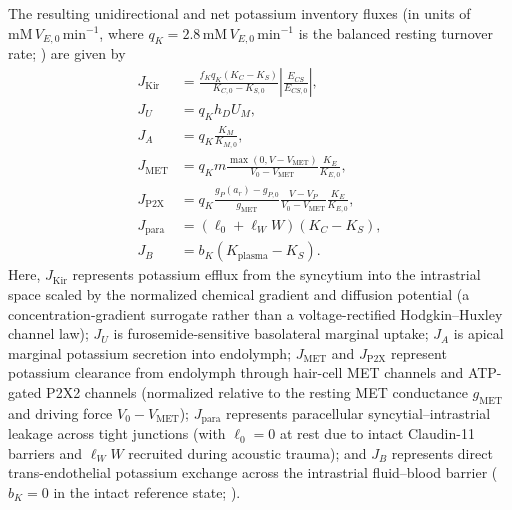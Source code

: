 \documentclass[final,5p,times]{elsarticle}
\begin{document}
The resulting unidirectional and net potassium inventory fluxes (in units of \(\mathrm{mM}\,V_{E,0}\,\mathrm{min}^{-1}\), where \(q_K = 2.8\,\mathrm{mM}\,V_{E,0}\,\mathrm{min}^{-1}\) is the balanced resting turnover rate; \citealt{Konishi1978,Nin2012}) are given by
\begin{align}
  J_{\mathrm{Kir}} &= \frac{f_K q_K (K_C - K_S)}{K_{C,0} - K_{S,0}}\left|\frac{E_{CS}}{E_{CS,0}}\right|, \label{eq:jkir}\\
  J_U &= q_K h_D U_M, \label{eq:ju}\\
  J_A &= q_K \frac{K_M}{K_{M,0}}, \label{eq:ja}\\
  J_{\mathrm{MET}} &= q_K m \frac{\max(0, V - V_{\mathrm{MET}})}{V_0 - V_{\mathrm{MET}}}\frac{K_E}{K_{E,0}}, \label{eq:jmet}\\
  J_{\mathrm{P2X}} &= q_K \frac{g_P(a_r) - g_{P,0}}{g_{\mathrm{MET}}}\frac{V - V_P}{V_0 - V_{\mathrm{MET}}}\frac{K_E}{K_{E,0}}, \label{eq:jp2x}\\
  J_{\mathrm{para}} &= (\ell_0 + \ell_W W)(K_C - K_S), \label{eq:jpara}\\
  J_B &= b_K(K_{\mathrm{plasma}} - K_S). \label{eq:jb}
\end{align}
Here, \(J_{\mathrm{Kir}}\) represents potassium efflux from the syncytium into the intrastrial space scaled by the normalized chemical gradient and diffusion potential (a concentration-gradient surrogate rather than a voltage-rectified Hodgkin--Huxley channel law); \(J_U\) is furosemide-sensitive basolateral marginal uptake; \(J_A\) is apical marginal potassium secretion into endolymph; \(J_{\mathrm{MET}}\) and \(J_{\mathrm{P2X}}\) represent potassium clearance from endolymph through hair-cell MET channels and ATP-gated P2X2 channels (normalized relative to the resting MET conductance \(g_{\mathrm{MET}}\) and driving force \(V_0 - V_{\mathrm{MET}}\)); \(J_{\mathrm{para}}\) represents paracellular syncytial--intrastrial leakage across tight junctions (with \(\ell_0 = 0\) at rest due to intact Claudin-11 barriers and \(\ell_W W\) recruited during acoustic trauma); and \(J_B\) represents direct trans-endothelial potassium exchange across the intrastrial fluid--blood barrier (\(b_K = 0\) in the intact reference state; \citealt{Shi2016}).
\end{document}
